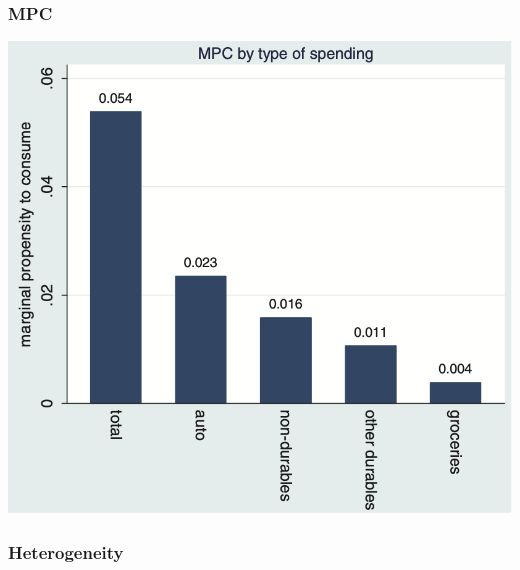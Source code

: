 \documentclass[english,xcolor=svgnames]{beamer}
\begin{document}
\begin{frame}
\frametitle[alignment=center]{MPC}
\centering
\includegraphics[scale=0.6]{figures/MRSFIG4b.png}
\end{frame}


\begin{frame}
\frametitle[alignment=center]{Heterogeneity}

\end{frame}
\end{document}
